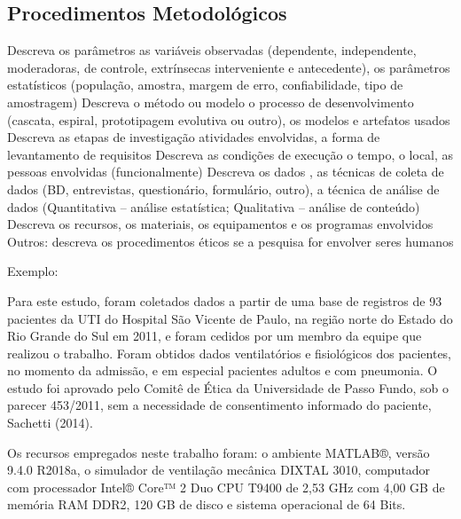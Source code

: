 \documentclass[
	article,			    %
	12pt,				    %
	oneside,			    %
	a4paper,			    %
	chapter=TITLE,		    %
	section=TITLE,		    %
	subsection=TITLE,	    %
	english,			    %
	brazil,				    %
	sumario=tradicional
]{abntex2}
\begin{document}
\subsection{Procedimentos Metodológicos}
Descreva os parâmetros as variáveis observadas (dependente, independente, moderadoras, de controle, extrínsecas interveniente e antecedente), os parâmetros estatísticos (população, amostra, margem de erro, confiabilidade, tipo de amostragem)
Descreva o método ou modelo o processo de desenvolvimento (cascata, espiral, prototipagem evolutiva ou outro), os modelos e artefatos usados
Descreva as etapas de investigação atividades envolvidas, a forma de levantamento de requisitos
Descreva as condições de execução o tempo, o local, as pessoas envolvidas (funcionalmente)
Descreva os dados , as técnicas de coleta de dados (BD, entrevistas, questionário, formulário, outro), a técnica de análise de dados (Quantitativa – análise estatística; Qualitativa – análise de conteúdo)
Descreva os recursos, os materiais, os equipamentos e os programas envolvidos
Outros: descreva os procedimentos éticos se a pesquisa for envolver seres humanos

Exemplo:

Para este estudo, foram coletados dados a partir de uma base de registros de 93 pacientes da UTI do Hospital São Vicente de Paulo, na região norte do Estado do Rio Grande do Sul em 2011, e foram cedidos por um membro da equipe que realizou o trabalho. Foram obtidos dados ventilatórios e fisiológicos dos pacientes, no momento da admissão, e em especial pacientes adultos e com pneumonia. O estudo foi aprovado pelo Comitê de Ética da Universidade de Passo Fundo, sob o parecer 453/2011, sem a necessidade de consentimento informado do paciente, Sachetti (2014).

Os recursos empregados neste trabalho foram: o ambiente MATLAB®, versão 9.4.0 R2018a, o simulador de ventilação mecânica DIXTAL 3010, computador com processador Intel® Core™ 2 Duo CPU T9400 de 2,53 GHz com 4,00 GB de memória RAM DDR2, 120 GB de disco e sistema operacional de 64 Bits.
\end{document}
